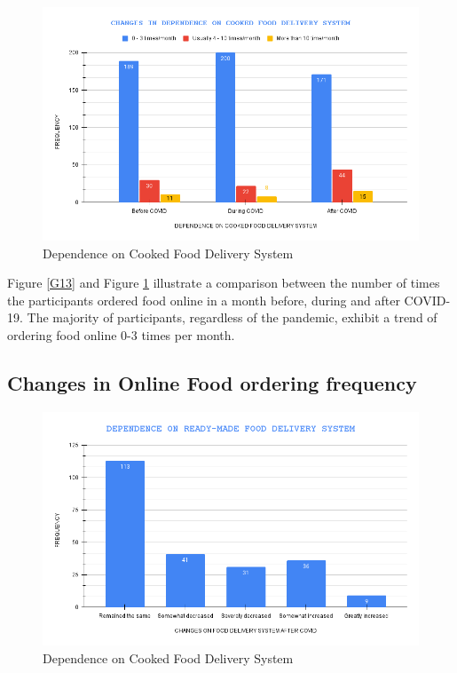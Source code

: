 \ 

\begin{figure}[h!]
	\centering
	\includegraphics[width=0.8\linewidth]{IMAGES/Image 14.png}
	\caption{Dependence on Cooked Food Delivery System}
	\label{G14}
\end{figure}

Figure \ref{G13} and Figure \ref{G14} illustrate a comparison between the number of times the participants ordered food online in a month before, during and after COVID-19. The majority of participants, regardless of the pandemic, exhibit a trend of ordering food online 0-3 times per month.

\newpage

\subsection{Changes in Online Food ordering frequency}

\begin{figure}[h!]
	\centering
	\includegraphics[width=0.9\linewidth]{IMAGES/Image 15.png}
	\caption{Dependence on Cooked Food Delivery System}
	\label{G15}
\end{figure}

